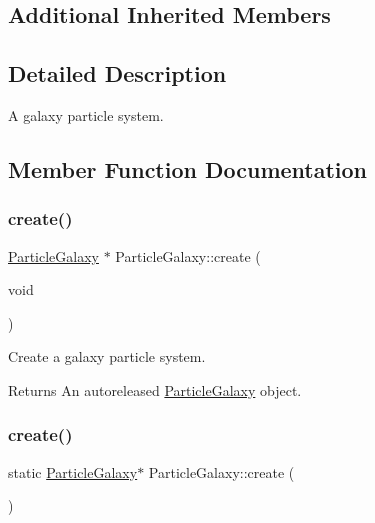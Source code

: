 \subsection*{Additional Inherited Members}


\subsection{Detailed Description}
A galaxy particle system. 

\subsection{Member Function Documentation}
\mbox{\label{classParticleGalaxy_adf9a661300a0cad1f23f834bf69e9ecd}} 
\subsubsection{\texorpdfstring{create()}{create()}\hspace{0.1cm}{\footnotesize\ttfamily [1/2]}}
{\footnotesize\ttfamily \hyperlink{classParticleGalaxy}{Particle\+Galaxy} $\ast$ Particle\+Galaxy\+::create (\begin{DoxyParamCaption}\item[{void}]{ }\end{DoxyParamCaption})\hspace{0.3cm}{\ttfamily [static]}}

Create a galaxy particle system.

\begin{DoxyReturn}{Returns}
An autoreleased \hyperlink{classParticleGalaxy}{Particle\+Galaxy} object. 
\end{DoxyReturn}
\mbox{\label{classParticleGalaxy_aa8cc941e8f4abbf48f627da5e13e2288}} 
\subsubsection{\texorpdfstring{create()}{create()}\hspace{0.1cm}{\footnotesize\ttfamily [2/2]}}
{\footnotesize\ttfamily static \hyperlink{classParticleGalaxy}{Particle\+Galaxy}$\ast$ Particle\+Galaxy\+::create (\begin{DoxyParamCaption}{ }\end{DoxyParamCaption})\hspace{0.3cm}{\ttfamily [static]}}

